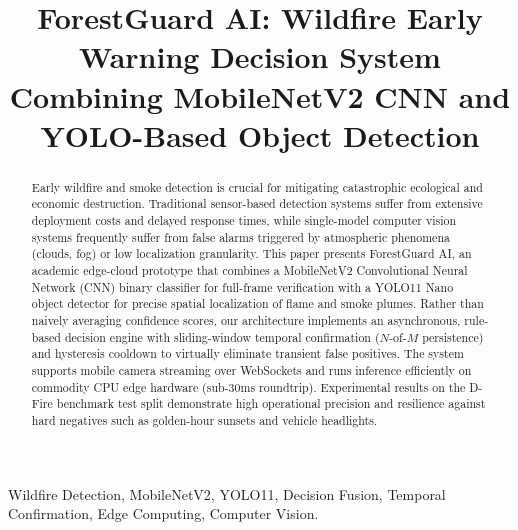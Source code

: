 \documentclass[conference]{IEEEtran}
\begin{document}
\title{ForestGuard AI: Wildfire Early Warning Decision System Combining MobileNetV2 CNN and YOLO-Based Object Detection}

\author{
\and
{}
}

\maketitle

\begin{abstract}
Early wildfire and smoke detection is crucial for mitigating catastrophic ecological and economic destruction. Traditional sensor-based detection systems suffer from extensive deployment costs and delayed response times, while single-model computer vision systems frequently suffer from false alarms triggered by atmospheric phenomena (clouds, fog) or low localization granularity. This paper presents ForestGuard AI, an academic edge-cloud prototype that combines a MobileNetV2 Convolutional Neural Network (CNN) binary classifier for full-frame verification with a YOLO11 Nano object detector for precise spatial localization of flame and smoke plumes. Rather than naively averaging confidence scores, our architecture implements an asynchronous, rule-based decision engine with sliding-window temporal confirmation ($N$-of-$M$ persistence) and hysteresis cooldown to virtually eliminate transient false positives. The system supports mobile camera streaming over WebSockets and runs inference efficiently on commodity CPU edge hardware (sub-30ms roundtrip). Experimental results on the D-Fire benchmark test split demonstrate high operational precision and resilience against hard negatives such as golden-hour sunsets and vehicle headlights.
\end{abstract}

\begin{IEEEkeywords}
Wildfire Detection, MobileNetV2, YOLO11, Decision Fusion, Temporal Confirmation, Edge Computing, Computer Vision.
\end{IEEEkeywords}
\end{document}
